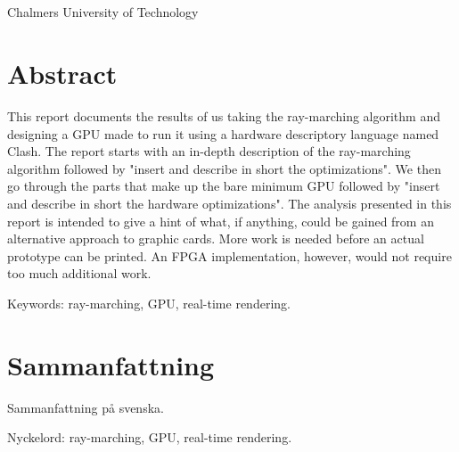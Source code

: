 \varHeadline\\
\varSubtitle\\
\varNames\\
\varDepartment\\
Chalmers University of Technology \setlength{\parskip}{0.5cm}

\thispagestyle{plain}			%
\setlength{\parskip}{0pt plus 1.0pt}
\section*{Abstract}

	This report documents the results of us taking the ray-marching algorithm
	and designing a GPU made to run it using a hardware descriptory language
	named Clash.\cite{Raa2015a} The report starts with an in-depth description
	of the ray-marching algorithm followed by "insert and describe in short the
	optimizations". We then go through the parts that make up the bare minimum
	GPU followed by "insert and describe in short the hardware optimizations".
	The analysis presented in this report is intended to give a hint of what,
	if anything, could be gained from an alternative approach to graphic cards.
	More work is needed before an actual prototype can be printed. An FPGA
	implementation, however, would not require too much additional work.

	\vfill
	Keywords: ray-marching, GPU, real-time rendering.

\newpage
\thispagestyle{plain}

\section*{Sammanfattning}
	
	Sammanfattning på svenska.
	
	\vfill
	Nyckelord: ray-marching, GPU, real-time rendering.


\newpage
\thispagestyle{empty}
\mbox{}
